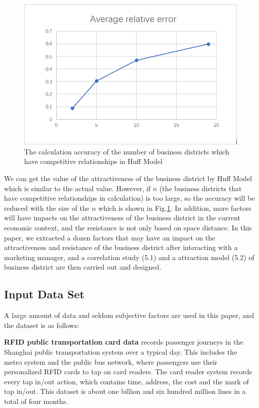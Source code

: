 \documentclass[journal,transmag]{IEEEtran}
\begin{document}
\begin{figure}[tb]
\centering
\includegraphics[width=1\columnwidth]{figure2.png}
\caption{The calculation accuracy of the number of business districts which have competitive relationships in Huff Model}
\label{fig:Huff-accuracy}
\end{figure}

We can get the value of the attractiveness of the business district by Huff Model which is similar to the actual value. However, if $n$ (the business districts that have competitive relationships in calculation) is too large, so the accuracy will be reduced with the size of the $n$ which is shown in Fig.\ref{fig:Huff-accuracy}. In addition, more factors will have impacts on the attractiveness of the business district in the current economic context, and the resistance is not only based on space distance. In this paper, we extracted a dozen factors that may have an impact on the attractiveness and resistance of the business district after interacting with a marketing manager, and a correlation study (5.1) and a attraction model (5.2) of business district are then carried out and designed.

\subsection{Input Data Set}
A large amount of data and seldom subjective factors are used in this paper, and the dataset is as follows:


\textbf{RFID public transportation card data} records passenger journeys in the Shanghai public transportation system over a typical day. This includes the metro system and the public bus network, where passengers use their personalized RFID cards to tap on card readers. The card reader system records every tap in/out action, which contains time, address, the cost and the mark of tap in/out. This dataset is about one billion and six hundred million lines in a total of four months.
\end{document}

